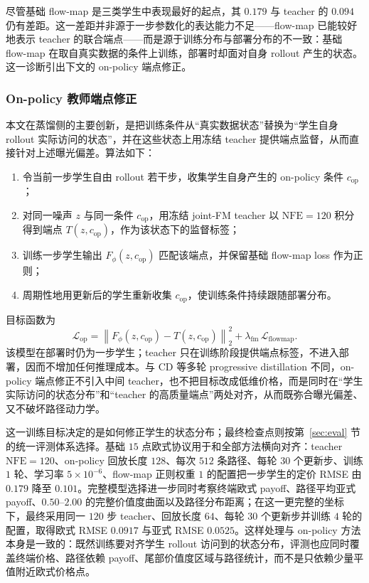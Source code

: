 \documentclass[11pt]{ctexart}
\newcommand{\nfe}{\mathrm{NFE}}
\begin{document}
尽管基础 flow-map 是三类学生中表现最好的起点，其 $0.179$ 与 teacher 的 $0.094$ 仍有差距。这一差距并非源于一步参数化的表达能力不足——flow-map 已能较好地表示 teacher 的联合端点——而是源于训练分布与部署分布的不一致：基础 flow-map 在取自真实数据的条件上训练，部署时却面对自身 rollout 产生的状态。这一诊断引出下文的 on-policy 端点修正。

\subsubsection{On-policy 教师端点修正}
\label{sec:onpolicy_method}
本文在蒸馏侧的主要创新，是把训练条件从“真实数据状态”替换为“学生自身 rollout 实际访问的状态”，并在这些状态上用冻结 teacher 提供端点监督，从而直接针对上述曝光偏差。算法如下：
\begin{enumerate}\itemsep2pt
\item 令当前一步学生自由 rollout 若干步，收集学生自身产生的 on-policy 条件 $c_{\mathrm{op}}$；
\item 对同一噪声 $z$ 与同一条件 $c_{\mathrm{op}}$，用冻结 joint-FM teacher 以 $\nfe{=}120$ 积分得到端点 $T(z,c_{\mathrm{op}})$，作为该状态下的监督标签；
\item 训练一步学生输出 $F_\phi(z,c_{\mathrm{op}})$ 匹配该端点，并保留基础 flow-map loss 作为正则；
\item 周期性地用更新后的学生重新收集 $c_{\mathrm{op}}$，使训练条件持续跟随部署分布。
\end{enumerate}
目标函数为
\begin{equation}
\mathcal L_{\mathrm{op}}
=\left\|F_\phi(z,c_{\mathrm{op}})-T(z,c_{\mathrm{op}})\right\|_2^2
+\lambda_{\mathrm{fm}}\,\mathcal L_{\mathrm{flowmap}} .
\end{equation}
该模型在部署时仍为一步学生；teacher 只在训练阶段提供端点标签，不进入部署，因而不增加任何推理成本。与 CD 等多轮 progressive distillation 不同，on-policy 端点修正不引入中间 teacher，也不把目标改成低维价格，而是同时在“学生实际访问的状态分布”和“teacher 的高质量端点”两处对齐，从而既弥合曝光偏差、又不破坏路径动力学。

这一训练目标决定的是如何修正学生的状态分布；最终检查点则按第~\ref{sec:eval} 节的统一评测体系选择。基础 $15$ 点欧式协议用于和全部方法横向对齐：teacher $\nfe{=}120$、on-policy 回放长度 $128$、每次 $512$ 条路径、每轮 $30$ 个更新步、训练 $1$ 轮、学习率 $5\times10^{-6}$、flow-map 正则权重 $1$ 的配置把一步学生的定价 RMSE 由 $0.179$ 降至 $0.101$。完整模型选择进一步同时考察终端欧式 payoff、路径平均亚式 payoff、$0.50$--$2.00$ 的完整价值度曲面以及路径分布距离；在这一更完整的坐标下，最终采用同一 $120$ 步 teacher、回放长度 $64$、每轮 $30$ 个更新步并训练 $4$ 轮的配置，取得欧式 RMSE $0.0917$ 与亚式 RMSE $0.0525$。这样处理与 on-policy 方法本身是一致的：既然训练要对齐学生 rollout 访问到的状态分布，评测也应同时覆盖终端价格、路径依赖 payoff、尾部价值度区域与路径统计，而不是只依赖少量平值附近欧式价格点。
\end{document}
